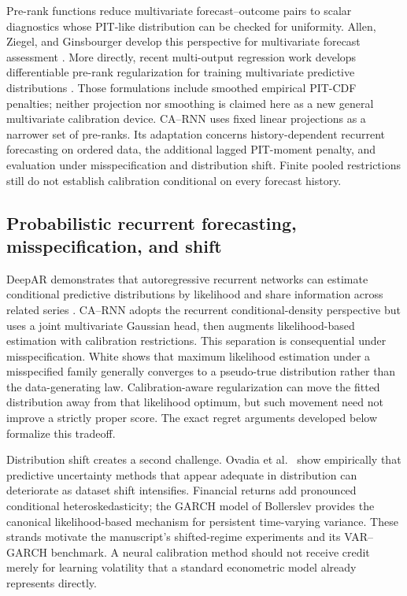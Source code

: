 \documentclass[11pt]{article}
\begin{document}
Pre-rank functions reduce multivariate forecast--outcome pairs to scalar
diagnostics whose PIT-like distribution can be checked for uniformity. Allen,
Ziegel, and Ginsbourger develop this perspective for multivariate forecast
assessment \cite{allen2024multivariate}. More directly, recent multi-output
regression work develops differentiable pre-rank regularization for training
multivariate predictive distributions \cite{desobry2025prerank,laajil2026prerank}.
Those formulations include smoothed empirical PIT-CDF penalties; neither
projection nor smoothing is claimed here as a new general multivariate
calibration device. CA--RNN uses fixed linear projections as a narrower set of
pre-ranks. Its adaptation concerns history-dependent recurrent forecasting on
ordered data, the additional lagged PIT-moment penalty, and evaluation under
misspecification and distribution shift. Finite pooled restrictions still do
not establish calibration conditional on every forecast history.

\subsection{Probabilistic recurrent forecasting, misspecification, and shift}

DeepAR demonstrates that autoregressive recurrent networks can estimate
conditional predictive distributions by likelihood and share information across
related series \cite{salinas2020deepar}.  CA--RNN adopts the recurrent
conditional-density perspective but uses a joint multivariate Gaussian head,
then augments likelihood-based estimation
with calibration restrictions.  This separation is consequential under
misspecification.  White \cite{white1982misspecification} shows that maximum
likelihood estimation under a misspecified family generally converges to a
pseudo-true distribution rather than the data-generating law.  Calibration-aware
regularization can move the fitted distribution away from that likelihood
optimum, but such movement need not improve a strictly proper score.  The exact
regret arguments developed below formalize this tradeoff.

Distribution shift creates a second challenge.  Ovadia et al.\
\cite{ovadia2019shift} show empirically that predictive uncertainty methods that
appear adequate in distribution can deteriorate as dataset shift intensifies.
Financial returns add pronounced conditional heteroskedasticity; the GARCH model
of Bollerslev \cite{bollerslev1986garch} provides the canonical likelihood-based
mechanism for persistent time-varying variance.  These strands motivate the
manuscript's shifted-regime experiments and its VAR--GARCH benchmark.  A neural
calibration method should not receive credit merely for learning volatility that
a standard econometric model already represents directly.
\end{document}
